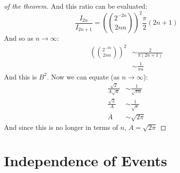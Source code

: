 \documentclass[../Main.tex]{subfiles}
\begin{document}
\begin{proof}[of the theorem]
    And this ratio can be evaluated:
    \begin{equation*}
        \frac{I_{2n}}{I_{2n+1}} = \left(2^{-2n} \choose{2n}{n}\right)^2 \frac{\pi}{2} (2n+1)
    \end{equation*}
    And so as $n \to \infty$:
    \begin{align*}
        \left(2^{-2n} \choose{2n}{n}\right)^2 &\sim \frac{2}{\pi(2n+1)} \\
        &\sim \frac{1}{\pi n}
    \end{align*}
    And this is $B^2$. Now we can equate (as $n \to \infty$):
    \begin{align*}
        \frac{\sqrt{2}}{A \sqrt{n}} &\sim \frac{1}{\sqrt{\pi n}} \\
        \frac{\sqrt{2}}{A} &\sim \frac{1}{\sqrt{\pi}} \\
        A &\sim \sqrt{2\pi}
    \end{align*}
    And since this is no longer in terms of $n$, $A = \sqrt{2\pi}$
\end{proof}
\section{Independence of Events}
\end{document}

